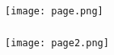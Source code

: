 \documentclass[t, 11pt]{beamer}
\begin{document}
	\begin{frame}
	\frametitle{\insertsection}
	\frametitle{\insertsubsection}
	
	
	\texttt{[image: page.png]}
\end{frame}

	\begin{frame}
	\frametitle{\insertsection}
	\frametitle{\insertsubsection}
	
	
	\texttt{[image: page2.png]}
\end{frame}
\end{document}
